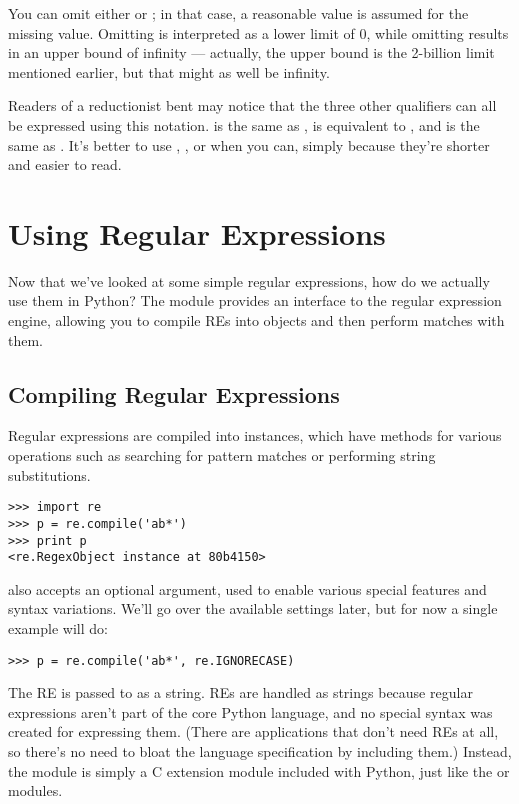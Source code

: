 \documentclass{howto}
\begin{document}
You can omit either  or ; in that case, a reasonable
value is assumed for the missing value.  Omitting  is
interpreted as a lower limit of 0, while omitting  results in
an upper bound of infinity --- actually, the upper bound is the
2-billion limit mentioned earlier, but that might as well be infinity.

Readers of a reductionist bent may notice that the three other qualifiers
can all be expressed using this notation.   is the same
as \regexp{*},  is equivalent to \regexp{+}, and
 is the same as .  It's better to use
\regexp{*}, \regexp{+}, or  when you can, simply because
they're shorter and easier to read.

\section{Using Regular Expressions}

Now that we've looked at some simple regular expressions, how do we
actually use them in Python?  The  module provides an
interface to the regular expression engine, allowing you to compile
REs into objects and then perform matches with them.

\subsection{Compiling Regular Expressions}

Regular expressions are compiled into  instances,
which have methods for various operations such as searching for
pattern matches or performing string substitutions.

\begin{verbatim}
>>> import re
>>> p = re.compile('ab*')
>>> print p
<re.RegexObject instance at 80b4150>
\end{verbatim}

 also accepts an optional 
argument, used to enable various special features and syntax
variations.  We'll go over the available settings later, but for now a
single example will do:

\begin{verbatim}
>>> p = re.compile('ab*', re.IGNORECASE)
\end{verbatim}

The RE is passed to  as a string.  REs are
handled as strings because regular expressions aren't part of the core
Python language, and no special syntax was created for expressing
them.  (There are applications that don't need REs at all, so there's
no need to bloat the language specification by including them.)
Instead, the  module is simply a C extension module
included with Python, just like the  or 
modules.
\end{document}
